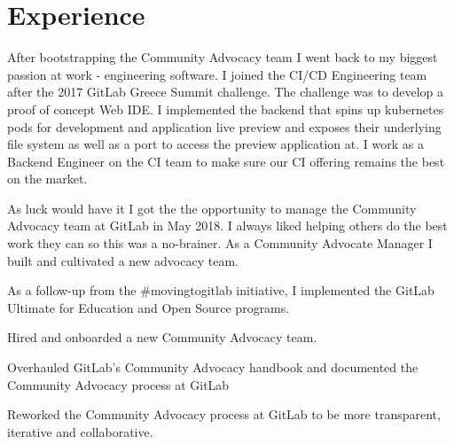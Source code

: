 \documentclass[]{matija-resume}
\begin{document}
\begin{minipage}[t]{0.66\textwidth} 


\section{Experience}
\vspace{\topsep}
After bootstrapping the Community Advocacy team I went back to my biggest passion at work - engineering software. I joined the CI/CD Engineering team after the 2017 GitLab Greece Summit challenge. The challenge was to develop a proof of concept Web IDE. I implemented the backend that spins up kubernetes pods for development and application live preview and exposes their underlying file system as well as a port to access the preview application at. I work as a Backend Engineer on the CI team to make sure our CI offering remains the best on the market.
\sectionsep

\vspace{\topsep}
As luck would have it I got the the opportunity to manage the Community Advocacy team at GitLab in May 2018. I always liked helping others do the best work they can so this was a no-brainer. As a Community Advocate Manager I built and cultivated a new advocacy team.
\vspace{\topsep}
\begin{tightemize}
\item As a follow-up from the \#movingtogitlab initiative, I implemented the GitLab Ultimate for Education and Open Source programs.
\item Hired and onboarded a new Community Advocacy team.
\item Overhauled GitLab's Community Advocacy handbook and documented the Community Advocacy process at GitLab
\item Reworked the Community Advocacy process at GitLab to be more transparent, iterative and collaborative.
\end{tightemize}
\sectionsep


\end{minipage}
\end{document}
